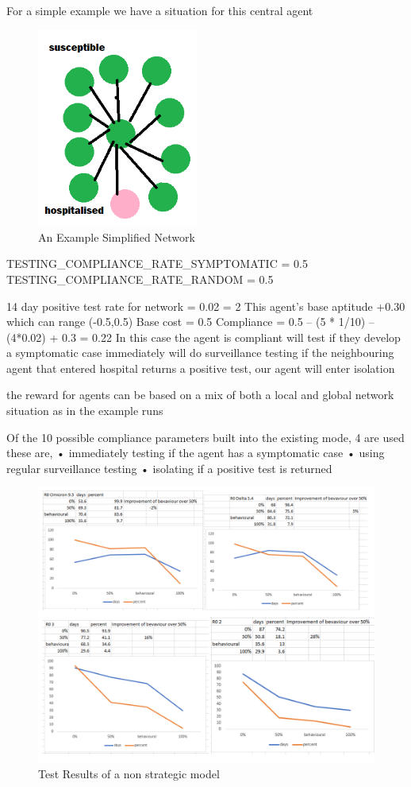 \documentclass{article}
\begin{document}
For a simple example we have a situation for this central agent 


\begin{figure}
  \centering
      \includegraphics[width =150pt]{basicnet}
  \caption{An Example Simplified Network}
\end{figure}


TESTING\_COMPLIANCE\_RATE\_SYMPTOMATIC                  = 0.5
TESTING\_COMPLIANCE\_RATE\_RANDOM                       = 0.5

14 day positive test rate for network = 0.02 = 2%
This agent’s base aptitude +0.30 which can range (-0.5,0.5)
Base cost = 0.5
Compliance = 0.5 – (5 * 1/10) – (4*0.02) + 0.3 = 0.22
In this case the agent is compliant
will test if they develop a symptomatic case immediately
will do surveillance testing 
if the neighbouring agent that entered hospital returns a positive test, our agent will enter isolation

the reward for agents can be based on a mix of both a local and global network situation as in the example runs

Of the 10 possible compliance parameters built into the existing mode, 4 are used these are,
•	immediately testing if the agent has a symptomatic case
•	using regular surveillance testing
•	isolating if a positive test is returned


\begin{figure}
  \centering
      \includegraphics[width=\textwidth]{basicgraph}
  \caption{Test Results of a non strategic model}
\end{figure}
\end{document}
